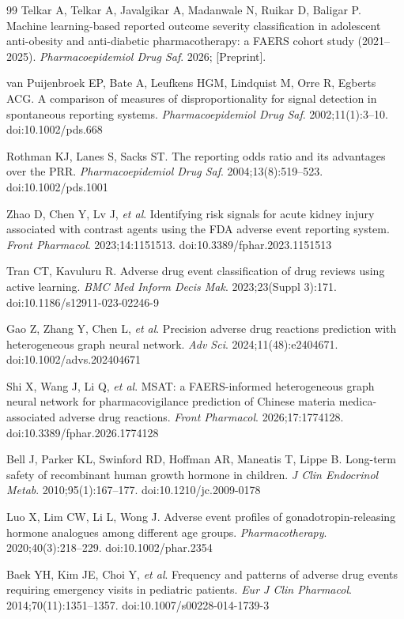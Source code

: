 \documentclass[10pt,twocolumn]{article}
\begin{document}
\begin{thebibliography}{99}
Telkar A, Telkar A, Javalgikar A, Madanwale N, Ruikar D, Baligar P.
Machine learning-based reported outcome severity classification in adolescent anti-obesity and anti-diabetic pharmacotherapy: a FAERS cohort study (2021--2025).
\textit{Pharmacoepidemiol Drug Saf}. 2026; [Preprint].
 
van Puijenbroek EP, Bate A, Leufkens HGM, Lindquist M, Orre R, Egberts ACG.
A comparison of measures of disproportionality for signal detection in spontaneous reporting systems.
\textit{Pharmacoepidemiol Drug Saf}. 2002;11(1):3--10.
doi:10.1002/pds.668
 
Rothman KJ, Lanes S, Sacks ST.
The reporting odds ratio and its advantages over the PRR.
\textit{Pharmacoepidemiol Drug Saf}. 2004;13(8):519--523.
doi:10.1002/pds.1001
 
Zhao D, Chen Y, Lv J, \textit{et al}.
Identifying risk signals for acute kidney injury associated with contrast agents using the FDA adverse event reporting system.
\textit{Front Pharmacol}. 2023;14:1151513.
doi:10.3389/fphar.2023.1151513
 
Tran CT, Kavuluru R.
Adverse drug event classification of drug reviews using active learning.
\textit{BMC Med Inform Decis Mak}. 2023;23(Suppl 3):171.
doi:10.1186/s12911-023-02246-9
 
Gao Z, Zhang Y, Chen L, \textit{et al}.
Precision adverse drug reactions prediction with heterogeneous graph neural network.
\textit{Adv Sci}. 2024;11(48):e2404671.
doi:10.1002/advs.202404671
 
Shi X, Wang J, Li Q, \textit{et al}.
MSAT: a FAERS-informed heterogeneous graph neural network for pharmacovigilance prediction of Chinese materia medica-associated adverse drug reactions.
\textit{Front Pharmacol}. 2026;17:1774128.
doi:10.3389/fphar.2026.1774128
 
Bell J, Parker KL, Swinford RD, Hoffman AR, Maneatis T, Lippe B.
Long-term safety of recombinant human growth hormone in children.
\textit{J Clin Endocrinol Metab}. 2010;95(1):167--177.
doi:10.1210/jc.2009-0178
 
Luo X, Lim CW, Li L, Wong J.
Adverse event profiles of gonadotropin-releasing hormone analogues among different age groups.
\textit{Pharmacotherapy}. 2020;40(3):218--229.
doi:10.1002/phar.2354
 
Baek YH, Kim JE, Choi Y, \textit{et al}.
Frequency and patterns of adverse drug events requiring emergency visits in pediatric patients.
\textit{Eur J Clin Pharmacol}. 2014;70(11):1351--1357.
doi:10.1007/s00228-014-1739-3
 

\end{thebibliography}
\end{document}
